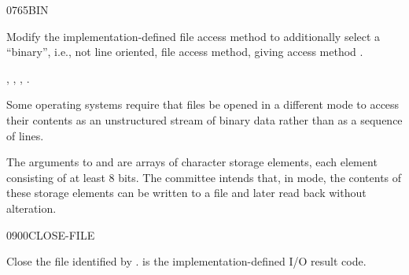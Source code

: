 \begin{worddef}{0765}{BIN}
\item {}

	Modify the implementation-defined file access method
	 to additionally select a \linebreak
	``binary'', i.e., not line oriented, file access method,
	giving access method .

\see {},
	,
	,
	.

	\begin{rationale} %
		Some operating systems require that files be opened in a
		different mode to access their contents as an unstructured
		stream of binary data rather than as a sequence of lines.

		The arguments to  and  are
		arrays of character storage elements, each element consisting
		of at least 8 bits. The committee intends that, in
		 mode, the contents of these storage elements can be
		written to a file and later read back without alteration.
	\end{rationale}
\end{worddef}


\begin{worddef}{0900}{CLOSE-FILE}
\item {}

	Close the file identified by .  is the
	implementation-defined I/O result code.
\end{worddef}


